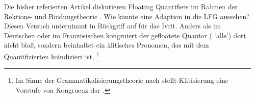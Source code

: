 \label{phsec:hebrqf}
Die bisher referierten Artikel diskutieren Floating Quantifiers im Rahmen der
Rektions- und Bindungstheorie \autocite{chomsky1981}. Wie könnte eine Adaption
in die LFG aussehen? Diesen Versuch unternimmt \citet{spector2009} in Rückgriff
auf \citet{shlonsky1991} für das Ivrit. Anders als im Deutschen oder im
Französischen kongruiert der gefloatete Quantor ( `alle') dort
nicht bloß, sondern beinhaltet ein klitisches Pronomen, das mit dem
Quantifizierten koindiziert ist.%
%
	\footnote{Im Sinne der Grammatikalisierungs\-theorie nach \citet{lehmann2015}
		stellt Klitisierung eine Vorstufe von Kongruenz dar
		\autocite[vgl.][44]{lehmann2015}.%
	}
%

